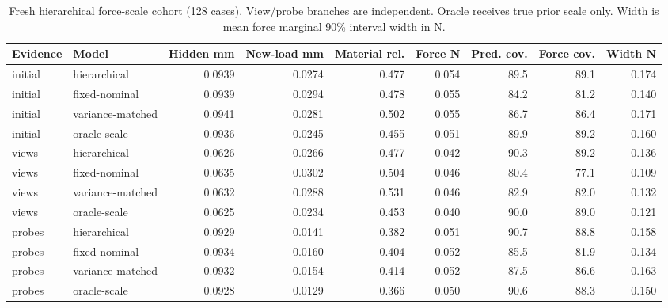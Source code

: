 \begin{table}[!t]\centering\small\setlength{\tabcolsep}{4pt}
\caption{Fresh hierarchical force-scale cohort (128 cases). View/probe branches are independent. Oracle receives true prior scale only. Width is mean force marginal 90\% interval width in N.}
\begin{tabular}{llrrrrrrr}\toprule
Evidence & Model & Hidden mm & New-load mm & Material rel. & Force N & Pred. cov. & Force cov. & Width N\\\midrule
initial & hierarchical & 0.0939 & 0.0274 & 0.477 & 0.054 & 89.5 & 89.1 & 0.174\\
initial & fixed-nominal & 0.0939 & 0.0294 & 0.478 & 0.055 & 84.2 & 81.2 & 0.140\\
initial & variance-matched & 0.0941 & 0.0281 & 0.502 & 0.055 & 86.7 & 86.4 & 0.171\\
initial & oracle-scale & 0.0936 & 0.0245 & 0.455 & 0.051 & 89.9 & 89.2 & 0.160\\
views & hierarchical & 0.0626 & 0.0266 & 0.477 & 0.042 & 90.3 & 89.2 & 0.136\\
views & fixed-nominal & 0.0635 & 0.0302 & 0.504 & 0.046 & 80.4 & 77.1 & 0.109\\
views & variance-matched & 0.0632 & 0.0288 & 0.531 & 0.046 & 82.9 & 82.0 & 0.132\\
views & oracle-scale & 0.0625 & 0.0234 & 0.453 & 0.040 & 90.0 & 89.0 & 0.121\\
probes & hierarchical & 0.0929 & 0.0141 & 0.382 & 0.051 & 90.7 & 88.8 & 0.158\\
probes & fixed-nominal & 0.0934 & 0.0160 & 0.404 & 0.052 & 85.5 & 81.9 & 0.134\\
probes & variance-matched & 0.0932 & 0.0154 & 0.414 & 0.052 & 87.5 & 86.6 & 0.163\\
probes & oracle-scale & 0.0928 & 0.0129 & 0.366 & 0.050 & 90.6 & 88.3 & 0.150\\
\bottomrule\end{tabular}
\end{table}

